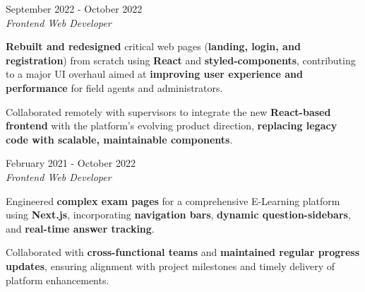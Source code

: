 \documentclass[../main.tex]{subfiles}
\begin{document}
\vspace{0.4 cm}

\begin{twocolentry}{September 2022 - October 2022}
     \\
    \vspace{0.10 cm}
    \textit{Frontend Web Developer}
\end{twocolentry}

\vspace{0.10 cm}
\begin{onecolentry}
\begin{highlights}
    \item \textbf{Rebuilt and redesigned} critical web pages (\textbf{landing, login, and registration}) from scratch using \textbf{React} and \textbf{styled-components}, contributing to a major UI overhaul aimed at \textbf{improving user experience and performance} for field agents and administrators.
    \item Collaborated remotely with supervisors to integrate the new \textbf{React-based frontend} with the platform’s evolving product direction, \textbf{replacing legacy code with scalable, maintainable components}.
\end{highlights}
\end{onecolentry}

\vspace{0.4 cm}

\begin{twocolentry}{February 2021 - October 2022}
     \\
    \vspace{0.10 cm}
    \textit{Frontend Web Developer}
\end{twocolentry}

\vspace{0.10 cm}
\begin{onecolentry}
\begin{highlights}
    \item Engineered \textbf{complex exam pages} for a comprehensive E-Learning platform using \textbf{Next.js}, incorporating \textbf{navigation bars}, \textbf{dynamic question-sidebars}, and \textbf{real-time answer tracking}.
    \item Collaborated with \textbf{cross-functional teams} and \textbf{maintained regular progress updates}, ensuring alignment with project milestones and timely delivery of platform enhancements.
\end{highlights}
\end{onecolentry}
\end{document}
